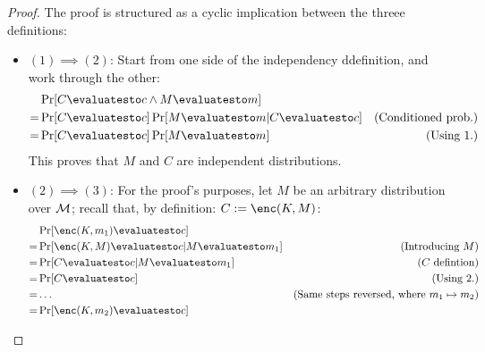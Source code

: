 \begin{proof}
    The proof is structured as a cyclic implication between the threee definitions:
    
    \begin{itemize}
        \item $(1) \implies (2)$: Start from one side of the independency ddefinition, and work through the other:
        \begin{align*}
            & \Pr[C \evaluatesto c \wedge M \evaluatesto m] \\
            =& \Pr[C \evaluatesto c] \Pr[M \evaluatesto m|C \evaluatesto c] & \text{(Conditioned prob.)} \\
            =& \Pr[C \evaluatesto c] \Pr[M \evaluatesto m] & \text{(Using 1.)} \\
        \end{align*}
        This proves that $M$ and $C$ are independent distributions.
        
        \item $(2) \implies (3)$: For the proof's purposes, let $M$ be an arbitrary distribution over $\mathcal{M}$; recall that, by definition: $C := \enc(K, M)$:
        \begin{align*}
            & \Pr[\enc(K, m_1) \evaluatesto c] & \\
            =& \Pr[\enc(K, M) \evaluatesto c| M \evaluatesto m_1] & \text{(Introducing $M$)} \\
            =& \Pr[C \evaluatesto c|M \evaluatesto m_1] & \text{($C$ defintion)} \\
            =& \Pr[C \evaluatesto c] & \text{(Using 2.)} \\
            =& \dots & \text{(Same steps reversed, where $m_1 \mapsto m_2$)} \\
            =& \Pr[\enc(K, m_2) \evaluatesto c] & 
        \end{align*}



\end{itemize}
\end{proof}
